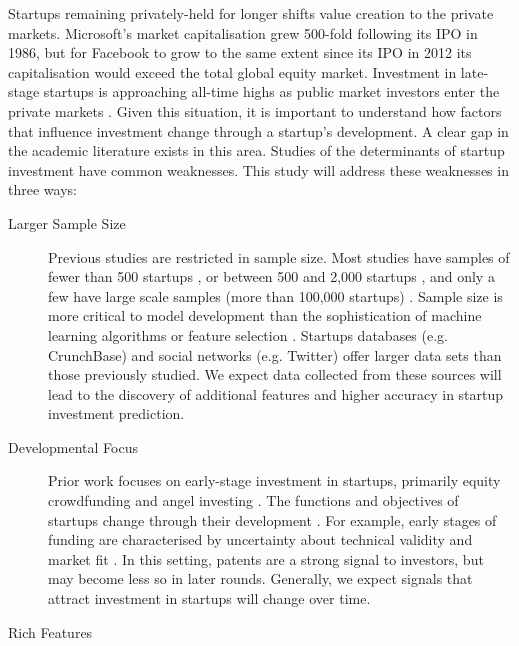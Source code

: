 \documentclass[../thesis/thesis.tex]{subfiles}
\begin{document}
\begin{refsection}

Startups remaining privately-held for longer shifts value creation to the private markets. Microsoft's market capitalisation grew 500-fold following its IPO in 1986, but for Facebook to grow to the same extent since its IPO in 2012 its capitalisation would exceed the total global equity market. Investment in late-stage startups is approaching all-time highs as public market investors enter the private markets \cite{nvca2016}. Given this situation, it is important to understand how factors that influence investment change through a startup's development. A clear gap in the academic literature exists in this area. Studies of the determinants of startup investment have common weaknesses. This study will address these weaknesses in three ways:

\begin{description}

\item[Larger Sample Size]

Previous studies are restricted in sample size. Most studies have samples of fewer than 500 startups \cite{ahlers2015, gimmon2010}, or between 500 and 2,000 startups \cite{hoenen2014, yu2015, an2015, werth2013, croce2016}, and only a few have large scale samples (more than 100,000 startups) \cite{shan2014, cheng2016}. Sample size is more critical to model development than the sophistication of machine learning algorithms or feature selection \cite{caruana2008}. Startups databases (e.g. CrunchBase) and social networks (e.g. Twitter) offer larger data sets than those previously studied. We expect data collected from these sources will lead to the discovery of additional features and higher accuracy in startup investment prediction.

\item[Developmental Focus]

Prior work focuses on early-stage investment in startups, primarily equity crowdfunding \cite{beckwith2016, ahlers2015, cheng2016, yuan2016} and angel investing \cite{croce2016}. The functions and objectives of startups change through their development \cite{mcmullen2013}. For example, early stages of funding are characterised by uncertainty about technical validity and market fit \cite{hsu2008}. In this setting, patents are a strong signal to investors, but may become less so in later rounds. Generally, we expect signals that attract investment in startups will change over time.

\item[Rich Features]


\end{description}
\end{refsection}
\end{document}

